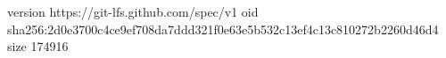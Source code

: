 version https://git-lfs.github.com/spec/v1
oid sha256:2d0e3700c4ce9ef708da7ddd321f0e63e5b532c13ef4c13c810272b2260d46d4
size 174916
